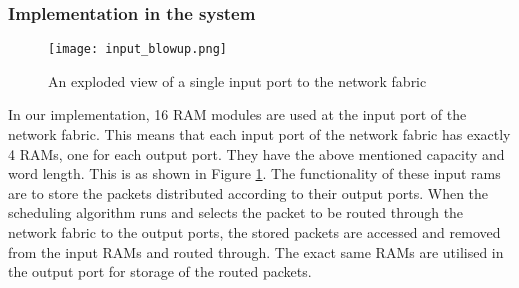 \documentclass[twoside,12pt,fleqn]{book} %
\begin{document}
\subsubsection{Implementation in the system}
\begin{figure}[ht]
    \centering
    \texttt{[image: input\_blowup.png]}
    \caption{An exploded view of a single input port to the network fabric}
    \label{fig:input_blowup}
\end{figure}
In our implementation, 16 RAM modules are used at the input port of the network fabric. This means that each input port of the network fabric has exactly 4 RAMs, one for each output port. They have the above mentioned capacity and word length. This is as shown in Figure \ref{fig:input_blowup}. 
The functionality of these input rams are to store the packets distributed according to their output ports. When the scheduling algorithm runs and selects the packet to be routed through the network fabric to the output ports, the stored packets are accessed and removed from the input RAMs and routed through. The exact same RAMs are utilised in the output port for storage of the routed packets. 
\end{document}
